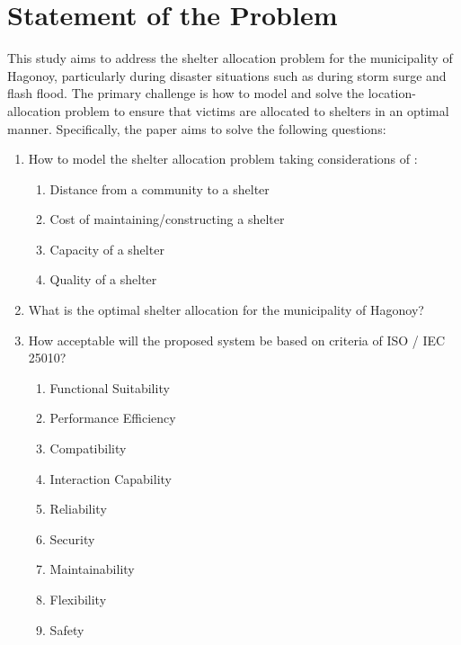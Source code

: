 \section{Statement of the Problem}

This study aims to address the shelter allocation problem for the municipality of Hagonoy, particularly during disaster situations such as during storm surge and flash flood. The primary challenge is how to model and solve the location-allocation problem to ensure that victims are allocated to shelters in an optimal manner. Specifically, the paper aims to solve the following questions:

\begin{enumerate}
	\item How to model the shelter allocation problem taking considerations of :
	\begin{enumerate}
		\item Distance from a community to a shelter
		\item Cost of maintaining/constructing a shelter
		\item Capacity of a shelter
		\item Quality  of a shelter
	\end{enumerate}
	\item What is the optimal shelter allocation for the municipality of Hagonoy?
	\item How acceptable will the proposed system be based on criteria of ISO / IEC 25010?
	\begin{enumerate}
		\item Functional Suitability
		\item Performance Efficiency
		\item Compatibility
		\item Interaction Capability
		\item Reliability
		\item Security
		\item Maintainability
		\item Flexibility
		\item Safety
	\end{enumerate}
\end{enumerate}